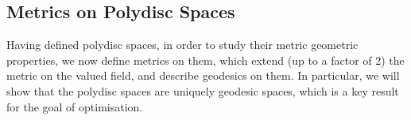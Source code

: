 \documentclass[10pt]{article}
\theoremstyle{definition}
\newtheorem{example}[theorem]{Example}
\newcommand{\CC}{\mathbb{C}}
\begin{document}

\subsection{Metrics on Polydisc Spaces}

Having defined polydisc spaces, in order to study their metric geometric properties, we now define metrics on them, which extend (up to a factor of 2) the metric on the valued field, and describe geodesics on them.  In particular, we will show that the polydisc spaces are uniquely geodesic spaces, which is a key result for the goal of optimisation.
\end{document}
